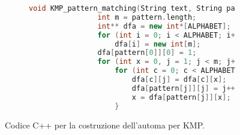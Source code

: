 \documentclass{subfiles}
\begin{document}
\begin{figure}[h!]
    \centering
    \begin{subfigure}[b]{.7\textwidth}
        \centering
        \begin{lstlisting}[language = C++]
            void KMP_pattern_matching(String text, String pattern)
                int m = pattern.length;
                int** dfa = new int*[ALPHABET];
                for (int i = 0; i < ALPHABET; i++)
                    dfa[i] = new int[m];
                dfa[pattern[0]][0] = 1;
                for (int x = 0, j = 1; j < m; j++)
                    for (int c = 0; c < ALPHABET){
                        dfa[c][j] = dfa[c][x];
                        dfa[pattern[j]][j] = j++;
                        x = dfa[pattern[j]][x];
                    }
        \end{lstlisting}
    \end{subfigure}
    \caption{Codice C++ per la costruzione dell'automa per KMP.}
    \label{Fig:10}
\end{figure}
\end{document}
